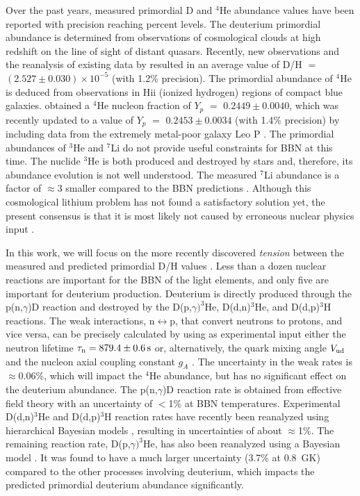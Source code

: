 \documentclass[twocolumn]{aastex63}
\begin{document}
Over the past years, measured primordial D and $^4$He abundance values have been reported with precision reaching percent levels. The deuterium primordial abundance is determined from observations of cosmological clouds at high redshift on the line of sight of distant quasars. Recently, new observations and the reanalysis of existing data by \cite{Cooke2018} resulted in an average value of D/H $=$ $(2.527\pm 0.030)\times10^{-5}$ (with 1.2\% precision). The primordial abundance of $^4$He is deduced from observations in H{\sc ii} (ionized hydrogen) regions of compact blue galaxies. \cite{Aver2015} obtained a $^4$He nucleon fraction of $Y_p$ $=$ $0.2449\pm 0.0040$, which was recently updated to a value of $Y_p$ $=$ $0.2453\pm0.0034$ (with 1.4\% precision) by including data from the extremely metal-poor galaxy Leo P \citep{Ave21}. The primordial abundances of $^3$He and $^7$Li do not provide useful constraints for BBN at this time. The nuclide $^3$He is both produced and destroyed by stars and, therefore, its abundance evolution is not well understood. The measured $^7$Li abundance is a factor of $\approx3$ smaller compared to the BBN predictions \citep[e.g.,][]{Fie11,Pitrou2018}. Although this cosmological lithium problem has not found a satisfactory solution yet, the present consensus is that it is most likely not caused by erroneous nuclear physics input \citep{Dav20,IC20}.
 
In this work, we will focus on the more recently discovered {\it tension} between the measured and predicted primordial D/H values \citep{Coc15,Pitrou2018,IC20}. Less than a dozen nuclear reactions are important for the BBN of the light elements, and only five are important for deuterium production. Deuterium is directly produced through the p(n,$\gamma$)D reaction and destroyed by the D(p,$\gamma)^3$He, D(d,n)$^3$He, and D(d,p)$^3$H reactions. The weak interactions, n$\leftrightarrow$p, that convert neutrons to protons, and vice versa, can be precisely calculated by using as experimental input either the neutron lifetime $\tau_{\rm n} = 879.4 \pm 0.6\,{\rm s}$ \citep{PDG2020} or, alternatively, the quark mixing angle $V_{\rm ud}$ and the nucleon axial coupling constant $g_A$ \citep{Pitrou2018,Pit21}. The uncertainty in the weak rates is $\approx$0.06\%, which will impact the $^4$He abundance, but has no significant effect on the deuterium abundance. The p(n,$\gamma$)D reaction rate is obtained from effective field theory \citep{Ando2006} with an uncertainty of $<$1\% at BBN temperatures. Experimental D(d,n)$^3$He and D(d,p)$^3$H reaction rates have recently been reanalyzed using hierarchical Bayesian models \citep{gomez17}, resulting in uncertainties of about $\approx$1\%. The remaining reaction rate, D(p,$\gamma)^3$He, has also been reanalyzed using a Bayesian model \citep{iliadis16}. It was found to have a much larger uncertainty (3.7\% at 0.8~GK) compared to the other processes involving deuterium, which impacts the predicted primordial deuterium abundance significantly. 
\end{document}
